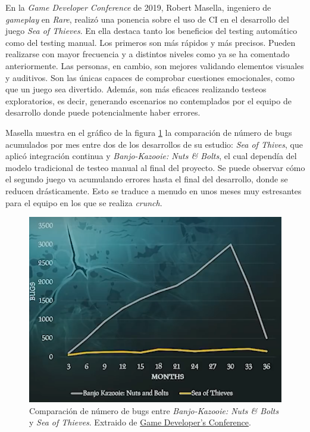 En la \textit{Game Developer Conference} de 2019, Robert Masella, ingeniero de \textit{gameplay} en \textit{Rare}, realizó una ponencia sobre el uso de CI en el desarrollo del juego \textit{Sea of Thieves}. En ella destaca tanto los beneficios del testing automático como del testing manual. Los primeros son más rápidos y más precisos. Pueden realizarse con mayor frecuencia y a distintos niveles como ya se ha comentado anteriormente. Las personas, en cambio, son mejores validando elementos visuales y auditivos. Son las únicas capaces de comprobar cuestiones emocionales, como que un juego sea divertido. Además, son más eficaces realizando testeos exploratorios, es decir, generando escenarios no contemplados por el equipo de desarrollo donde puede potencialmente haber errores.

Masella muestra en el gráfico de la figura \ref{fig:nuts-and-bolts} la comparación de número de bugs acumulados por mes entre dos de los desarrollos de su estudio: \textit{Sea of Thives}, que aplicó integración continua y \textit{Banjo-Kazooie: Nuts \& Bolts}, el cual dependía del modelo tradicional de testeo manual al final del proyecto. Se puede observar cómo el segundo juego va acumulando errores hasta el final del desarrollo, donde se reducen drásticamente. Esto se traduce a menudo en unos meses muy estresantes para el equipo en los que se realiza \textit{crunch}.

\begin{figure}[h]
    \centering
    \includegraphics[scale=0.4]{img/nuts-and-bolts.png}
    \caption[Comparación de número de bugs en juegos de \textit{Rare}]{Comparación de número de bugs entre \textit{Banjo-Kazooie: Nuts \& Bolts} y \textit{Sea of Thieves}. Extraido de \href{https://www.youtube.com/watch?v=X673tOi8pU8}{Game Developer's Conference}.}
    \label{fig:nuts-and-bolts}
\end{figure}

